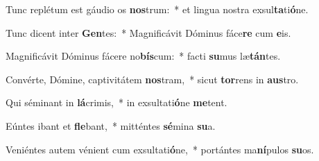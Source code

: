 \item Tunc replétum est gáudio os \textbf{nos}trum:~* et lingua nostra exsul\textbf{ta}ti\textbf{ó}ne.
\item Tunc dicent inter \textbf{Gen}tes:~* Magnificávit Dóminus fáce\textbf{re} cum \textbf{e}is.
\item Magnificávit Dóminus fácere no\textbf{bís}cum:~* facti \textbf{su}mus læ\textbf{tán}tes.
\item Convérte, Dómine, captivitátem \textbf{nos}tram,~* sicut \textbf{tor}rens in \textbf{aus}tro.
\item Qui séminant in \textbf{lá}crimis,~* in exsultati\textbf{ó}ne \textbf{me}tent.
\item Eúntes ibant et \textbf{fle}bant,~* mitténtes \textbf{sé}mina \textbf{su}a.
\item Veniéntes autem vénient cum exsultati\textbf{ó}ne,~* portántes ma\textbf{ní}pulos \textbf{su}os.
